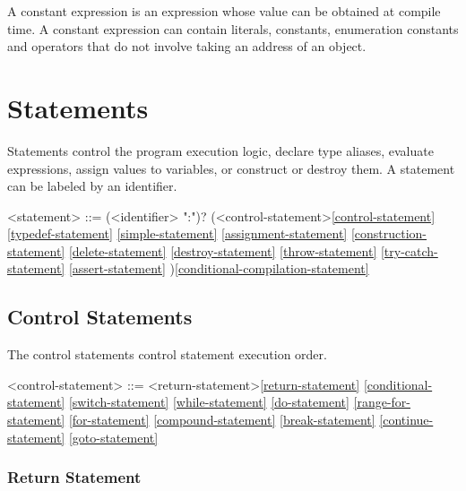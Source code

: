 \documentclass[a4paper,oneside,11pt]{article}
\begin{document}
A constant expression is an expression whose value can be obtained at compile time.
A constant expression can contain literals, constants, enumeration constants and operators that
do not involve taking an address of an object.

\section{Statements}

Statements control the program execution logic, declare type aliases, evaluate expressions,
assign values to variables, or construct or destroy them.
A statement can be labeled by an identifier.

\begin{grammar}
\label{statement}<statement> ::= (<identifier> ":")? (<control-statement>\ref{control-statement}
\ref{typedef-statement}
\ref{simple-statement}
\ref{assignment-statement}
\ref{construction-statement}
\ref{delete-statement}
\ref{destroy-statement}
\ref{throw-statement}
\ref{try-catch-statement}
\ref{assert-statement}
)\ref{conditional-compilation-statement}
\end{grammar}

\subsection{Control Statements}

The control statements control statement execution order.

\begin{grammar}
\label{control-statement}<control-statement> ::= <return-statement>\ref{return-statement}
\ref{conditional-statement}
\ref{switch-statement}
\ref{while-statement}
\ref{do-statement}
\ref{range-for-statement}
\ref{for-statement}
\ref{compound-statement}
\ref{break-statement}
\ref{continue-statement}
\ref{goto-statement}
\end{grammar}

\subsubsection{Return Statement}
\end{document}
